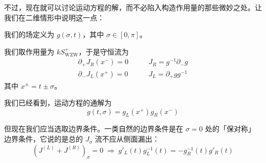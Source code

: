不过，现在就可以讨论运动方程的解，而不必陷入构造作用量的那些微妙之处。让我们在二维情形中说明这一点：

我们的场定义为 $g(\sigma,t)$，其中 $\sigma\in[0,\pi]$。

我们取作用量为 $kS^{+}_{\mathrm{WZW}}$，于是守恒流为
\begin{equation}
  \begin{aligned}
    \partial_+J_R(x^-)=0 &\qquad J_R=g^{-1}\partial_-g\\
    \partial_-J_L(x^+)=0 &\qquad J_L=\partial_+gg^{-1}
  \end{aligned}
  \tag{4.230}
  \label{eq:4.230}
\end{equation}
其中 $x^{\pm}=t\pm\sigma$。

我们已经看到，运动方程的通解为
\begin{equation}
  g(t,\sigma)=g_L(x^+)g_R(x^-)
  \tag{4.231}
  \label{eq:4.231}
\end{equation}

但现在我们应当选取边界条件。一类自然的边界条件是在 $\sigma=0$ 处的「保对称」边界条件，它说的是总的 $J_\sigma$ 流不应从侧面漏出：
\begin{equation}
  (J^{(L)}+J^{(R)})_\sigma=0\;\Rightarrow\;g'_L(t)g_L^{-1}(t)=-g_R^{-1}(t)g'_R(t)
  \tag{4.232}
  \label{eq:4.232}
\end{equation}

